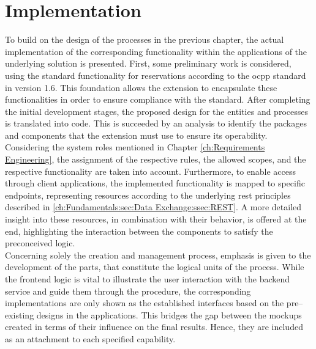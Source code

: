 
\chapter{Implementation}
\label{ch:Implementation}

To build on the design of the processes in the previous chapter, the actual implementation of the corresponding functionality within the applications of the underlying solution is presented.
First, some preliminary work is considered, using the standard functionality for reservations according to the \acrshort{ocpp} standard in version 1.6.
This foundation allows the extension to encapsulate these functionalities in order to ensure compliance with the standard.
After completing the initial development stages, the proposed design for the entities and processes is translated into code. This is succeeded by an analysis to identify the packages and components that the extension must use to ensure its operability.
Considering the system roles mentioned in Chapter \ref{ch:Requirements Engineering}, the assignment of the respective rules, the allowed scopes, and the respective functionality are taken into account.
Furthermore, to enable access through client applications, the implemented functionality is mapped to specific endpoints, representing resources according to the underlying \acrshort{rest} principles described in \ref{ch:Fundamentals:sec:Data Exchange:ssec:REST}.
A more detailed insight into these resources, in combination with their behavior, is offered at the end, highlighting the interaction between the components to satisfy the preconceived logic. \\
\noindent Concerning solely the creation and management process, emphasis is given to the development of the parts, that constitute the logical units of the process. 
While the frontend logic is vital to illustrate the user interaction with the backend service and guide them through the procedure, the corresponding implementations are only shown as the established interfaces based on the pre--existing designs in the applications.
This bridges the gap between the mockups created in terms of their influence on the final results. Hence, they are included as an attachment to each specified capability. 
